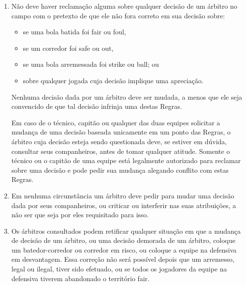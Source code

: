 \begin{enumerate}[label=(\alph*)]
\item Não deve haver reclamação alguma sobre qualquer decisão de um árbitro no campo com o pretexto de que ele não fora correto em sua decisão sobre:
\begin{itemize}
	\item se uma bola batida foi \gls{fair} ou \gls{foul},
	\item se um corredor foi \gls{safe} ou \gls{out},
	\item se uma bola arremessada foi \gls{strike} ou \gls{ball}; ou
	\item sobre qualquer jogada cuja decisão implique uma apreciação.
\end{itemize}


Nenhuma decisão dada por um árbitro deve ser mudada, a menos que ele seja convencido de que tal decisão infrinja uma destas Regras.

 Em caso de o técnico, capitão ou qualquer das duas equipes solicitar a mudança de uma decisão baseada unicamente em um ponto das Regras, o árbitro cuja decisão esteja sendo questionada deve, se estiver em dúvida, consultar seus companheiros, antes de tomar qualquer atitude. Somente o técnico ou o capitão de uma equipe está legalmente autorizado para reclamar sobre uma decisão e pode pedir sua mudança alegando conflito com estas Regras.

\item  Em nenhuma circunstância um árbitro deve pedir para mudar uma decisão dada por seus companheiros, ou criticar ou interferir nas suas atribuições, a não ser que seja por eles requisitado para isso.

\item  Os árbitros consultados podem retificar qualquer situação em que a mudança de decisão de um árbitro, ou uma decisão demorada de um árbitro, coloque um batedor-corredor ou corredor em risco, ou coloque a equipe na defensiva em  desvantagem. Essa correção não será possível depois que um arremesso, legal ou ilegal, tiver sido efetuado, ou se todos os jogadores da equipe na defensiva tiverem abandonado o território \gls{fair}.
\end{enumerate}

